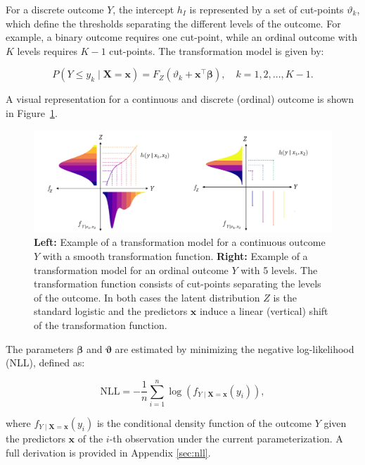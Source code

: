 For a discrete outcome $Y$, the intercept $h_I$ is represented by a set of cut-points $\vartheta_k$, which define the thresholds separating the different levels of the outcome. For example, a binary outcome requires one cut-point, while an ordinal outcome with $K$ levels requires $K-1$ cut-points. The transformation model is given by:

\begin{equation}
P(Y \leq y_k \mid \mathbf{X} = \mathbf{x}) = F_Z(\vartheta_k + \mathbf{x}^\top \boldsymbol{\beta}), \quad k = 1, 2, \ldots, K - 1.
\end{equation}


A visual representation for a continuous and discrete (ordinal) outcome is shown in Figure~\ref{fig:tram_cont_ord}.


\begin{figure}[H]
\centering
\includegraphics[width=1\textwidth]{img/tram_cont_ord.png}
\caption{\textbf{Left:} Example of a transformation model for a continuous outcome $Y$ with a smooth transformation function. \textbf{Right:} Example of a transformation model for an ordinal outcome $Y$ with 5 levels. The transformation function consists of cut-points separating the levels of the outcome.
In both cases the latent distribution $Z$ is the standard logistic and the predictors $\mathbf{x}$ induce a linear (vertical) shift of the transformation function.}
\label{fig:tram_cont_ord}
\end{figure}


The parameters $\boldsymbol{\beta}$ and $\boldsymbol{\vartheta}$ are estimated by minimizing the negative log-likelihood (NLL), defined as:


\begin{equation}
\text{NLL} = - \frac{1}{n} \sum_{i=1}^{n} \log \left(f_{Y \mid \mathbf{X} = \mathbf{x}}(y_i)\right),
\label{eq:nll_tram}
\end{equation}

where $f_{Y \mid \mathbf{X} = \mathbf{x}}(y_i)$ is the conditional density function of the outcome $Y$ given the predictors $\mathbf{x}$ of the $i$-th observation under the current parameterization. A full derivation is provided in Appendix \ref{sec:nll}.


